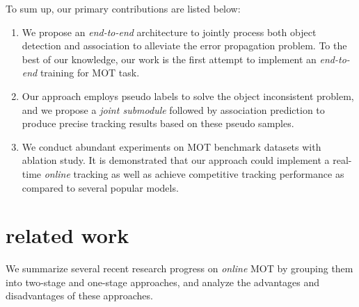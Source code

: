 \documentclass[acmsmall]{acmart}
\begin{document}
To sum up, our primary contributions are listed below:
{
\begin{enumerate} 
	\item {We propose an \emph{end-to-end} architecture to jointly process both object detection and association to alleviate the error propagation problem. To the best of our knowledge, our work is the first attempt to implement an \emph{end-to-end} training for MOT task.}
	\item {Our approach employs pseudo labels to solve the object inconsistent problem, and we propose a \emph{joint submodule} followed by association prediction to produce precise tracking results based on these pseudo samples.}
	\item {We conduct abundant experiments on MOT benchmark datasets with ablation study. It is demonstrated that our approach could implement a real-time \emph{online} tracking as well as achieve competitive tracking performance as compared to several popular models.}
\end{enumerate}
}



\section{related work} \label{related work}
We summarize several recent research progress on \emph{online} MOT by grouping them into two-stage and one-stage approaches, 
and analyze the advantages and disadvantages of these approaches. 
\end{document}
